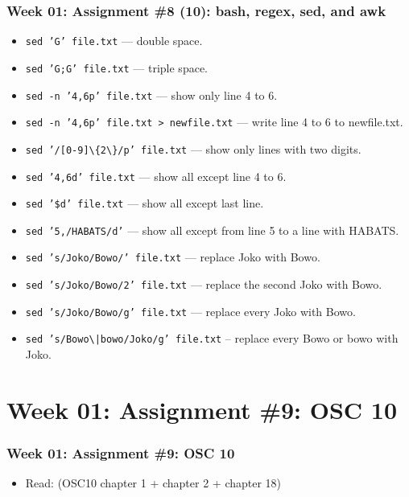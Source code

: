 \documentclass[xcolor=table, notheorems, hyperref={pdfpagelabels=false}]{beamer}
\begin{document}
\begin{frame}[fragile]
\frametitle{Week 01: Assignment \#8 (10): bash, regex, sed, and awk}
\begin{itemize}
\item \texttt{sed 'G'    file.txt} --- double space.
\item \texttt{sed 'G;G'  file.txt} --- triple space.
\item \texttt{sed -n '4,6p'  file.txt} --- show only line 4 to 6.
\item \texttt{sed -n '4,6p'  file.txt > newfile.txt} --- write line 4 to 6 to newfile.txt.
\item \texttt{sed '/[0-9]\textbackslash\{2\textbackslash\}/p' file.txt} --- show only lines with two digits. 
\item \texttt{sed '4,6d'     file.txt} --- show all except line 4 to 6.
\item \texttt{sed '\$d'      file.txt} --- show all except last line.
\item \texttt{sed '5,/HABATS/d'} --- show all except from line 5 to a line with HABATS.
\item \texttt{sed 's/Joko/Bowo/'  file.txt} --- replace Joko with Bowo.
\item \texttt{sed 's/Joko/Bowo/2' file.txt} --- replace the second Joko with Bowo.
\item \texttt{sed 's/Joko/Bowo/g' file.txt} --- replace every Joko with Bowo.
\item \texttt{sed 's/Bowo\textbackslash{}|bowo/Joko/g' file.txt} -- replace every Bowo or bowo with Joko.
\end{itemize}
\end{frame}

\section{Week 01: Assignment \#9: OSC 10}
\begin{frame}[fragile]
\frametitle{Week 01: Assignment \#9: OSC 10}
\begin{itemize}
\item Read: (OSC10 chapter 1 + chapter 2 + chapter 18)
\end{itemize}
\end{frame}

\end{document}
